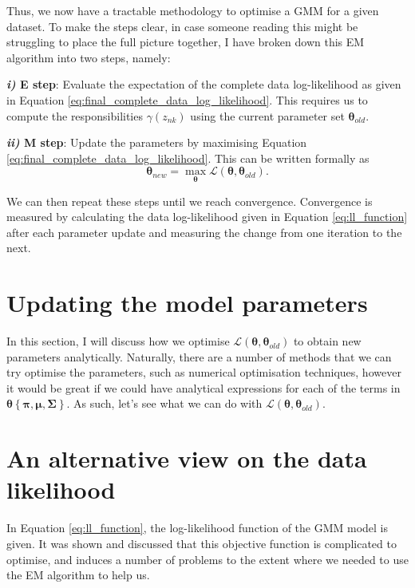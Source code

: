 \documentclass{article}
\begin{document}
Thus, we now have a tractable methodology to optimise a GMM for a given dataset. To make the steps clear, in case someone reading this might be struggling to place the full picture together, I have broken down this EM algorithm into two steps, namely:

\textbf{\emph{i)} E step}: Evaluate the expectation of the complete data log-likelihood as given in Equation \eqref{eq:final_complete_data_log_likelihood}. This requires us to compute the responsibilities $\gamma(z_{nk})$ using the current parameter set $\boldsymbol\theta_{old}$.

\bigskip

\textbf{\emph{ii)} M step}: Update the parameters by maximising Equation \eqref{eq:final_complete_data_log_likelihood}. This can be written formally as
\begin{equation}
\boldsymbol\theta_{new} = \max_{\boldsymbol\theta} \mathcal{L}(\boldsymbol\theta, \boldsymbol\theta_{old}).
\end{equation}

We can then repeat these steps until we reach convergence. Convergence is measured by calculating the data log-likelihood given in Equation \eqref{eq:ll_function} after each parameter update and measuring the change from one iteration to the next. 

\section{Updating the model parameters}

In this section, I will discuss how we optimise $\mathcal{L}(\boldsymbol\theta, \boldsymbol\theta_{old})$ to obtain new parameters analytically. Naturally, there are a number of methods that we can try optimise the parameters, such as numerical optimisation techniques, however it would be great if we could have analytical expressions for each of the terms in $\boldsymbol\theta \left\lbrace\boldsymbol\pi, \boldsymbol\mu, \boldsymbol\Sigma \right\rbrace$. As such, let's see what we can do with $\mathcal{L}(\boldsymbol\theta, \boldsymbol\theta_{old})$.


\section{An alternative view on the data likelihood}

In Equation \eqref{eq:ll_function}, the log-likelihood function of the GMM model is given. It was shown and discussed that this objective function is complicated to optimise, and induces a number of problems to the extent where we needed to use the EM algorithm to help us. 
\end{document}
